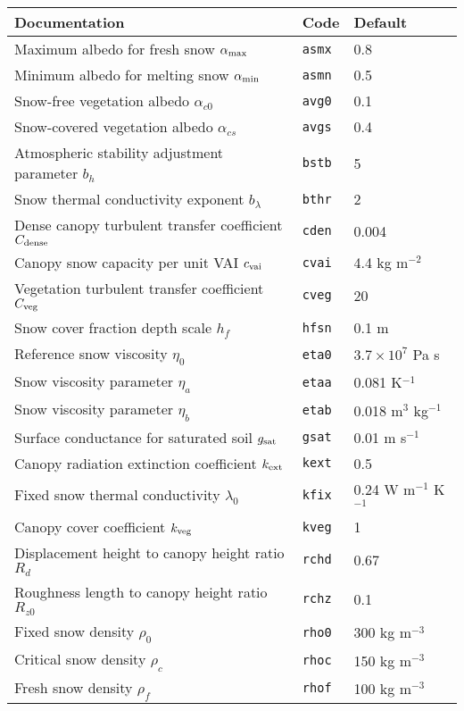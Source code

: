 \documentclass{article}
\begin{document}
\vskip20pt
\begin{tabular}{|l|l|l|}
\hline
Documentation & Code & Default \\
\hline
Maximum albedo for fresh snow $\alpha_{\rm max}$ & {\tt asmx} & 0.8 \\
Minimum albedo for melting snow $\alpha_{\rm min}$ & {\tt asmn} & 0.5 \\
Snow-free vegetation albedo $\alpha_{c0}$ & {\tt avg0} & 0.1 \\
Snow-covered vegetation albedo $\alpha_{cs}$ & {\tt avgs} & 0.4 \\ 
Atmospheric stability adjustment parameter $b_h$ & {\tt bstb} & 5 \\
Snow thermal conductivity exponent $b_\lambda$ & {\tt bthr} & 2 \\
Dense canopy turbulent transfer coefficient $C_{\rm dense}$ & {\tt cden} & 0.004 \\
Canopy snow capacity per unit VAI $c_{\rm vai}$ & {\tt cvai} & 4.4 kg m$^{-2}$ \\
Vegetation turbulent transfer coefficient $C_{\rm veg}$ & {\tt cveg} & 20 \\
Snow cover fraction depth scale $h_f$ & {\tt hfsn} & 0.1 m \\
Reference snow viscosity $\eta_0$ & {\tt eta0} & $3.7 \times 10^7$ Pa s \\
Snow viscosity parameter $\eta_a$ & {\tt etaa} & 0.081 K$^{-1}$ \\
Snow viscosity parameter $\eta_b$ & {\tt etab} & 0.018 m$^3$ kg$^{-1}$ \\
Surface conductance for saturated soil $g_{\rm sat}$ & {\tt gsat} & 0.01 m s$^{-1}$ \\
Canopy radiation extinction coefficient $k_{\rm ext}$ & {\tt kext} &  0.5 \\
Fixed snow thermal conductivity $\lambda_0$ & {\tt kfix} & 0.24 W m$^{-1}$ K$^{-1}$ \\
Canopy cover coefficient $k_{\rm veg}$ & {\tt kveg} &  1 \\
Displacement height to canopy height ratio $R_d$ & {\tt rchd} & 0.67 \\
Roughness length to canopy height ratio $R_{z0}$ & {\tt rchz} & 0.1 \\
Fixed snow density $\rho_0$ & {\tt rho0} & 300 kg m$^{-3}$ \\
Critical snow density $\rho_c$ & {\tt rhoc} & 150 kg m$^{-3}$ \\
Fresh snow density $\rho_f$ & {\tt rhof} & 100 kg m$^{-3}$ \\

\end{tabular}
\end{document}
